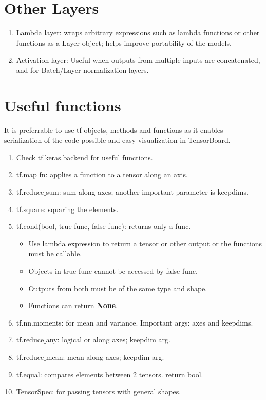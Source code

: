 \documentclass[11pt]{article}
\begin{document}
\begin{multicols*}{2}
\section{Other Layers}
\begin{enumerate}
\item Lambda layer: wraps arbitrary expressions such as lambda functions or other functions as a Layer object; helps improve portability of the models.
\item Activation layer: Useful when outputs from multiple inputs are concatenated, and for Batch/Layer normalization layers.
\end{enumerate}

\section{Useful functions}
It is preferrable to use tf objects, methods and functions as it enables serialization of the code possible and easy visualization in TensorBoard.

\begin{enumerate}
\item Check tf.keras.backend for useful functions.
\item tf.map$\_$fn: applies a function to a tensor along an axis.
\item tf.reduce$\_$sum: sum along axes; another important parameter is keepdims.
\item tf.square: squaring the elements.
\item tf.cond(bool, true func, false func): returns only a func. 
	\begin{itemize}
	\item Use lambda expression to return a tensor or other output or the functions must be callable. 
	\item Objects in true func cannot be accessed by false func.
	\item Outputs from both must be of the same type and shape.
	\item Functions can return \textbf{None}.
	\end{itemize}
\item tf.nn.moments: for mean and variance. Important args: axes and keepdims.
\item tf.reduce$\_$any: logical or along axes; keepdim arg.
\item tf.reduce$\_$mean: mean along axes; keepdim arg.
\item tf.equal: compares elements between 2 tensors. return bool.
\item TensorSpec: for passing tensors with general shapes.
\end{enumerate}


\end{multicols*}
\end{document}
